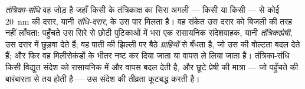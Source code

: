 \begin{definition}[तंत्रिका-संधि और तंत्रिकाप्रेषी]\label{def:g12:stretch-reflex:synapse}
\emph{तंत्रिका-संधि} वह जोड़ है जहाँ किसी  के
तंत्रिकाक्ष का सिरा अगली  --- किसी  या किसी  --- से
कोई \qty{20}{nm} की दरार, यानी \emph{संधि-दरार}, के उस पार मिलता है। वह
संकेत उस दरार को बिजली की तरह नहीं लाँघता: पहुँचते  उस सिरे से
छोटी पुटिकाओं में भरा एक रासायनिक संदेशवाहक, यानी
\emph{तंत्रिकाप्रेषी}, उस दरार में छुड़वा देते हैं; वह
पाती  की झिल्ली पर बैठे \emph{ग्राहियों} से बँधता है, जो उस  की
वोल्टता बदल देते हैं; और फिर वह मिलीसेकंडों के भीतर नष्ट कर दिया जाता या
वापस ले लिया जाता है। तंत्रिका-संधि किसी विद्युत संदेश को रासायनिक में और
वापस बदल देती है, और छूटे प्रेषी की मात्रा --- जो पहुँचते  की
बारंबारता से तय होती है --- उस संदेश की तीव्रता कूटबद्ध करती है।
\end{definition}


